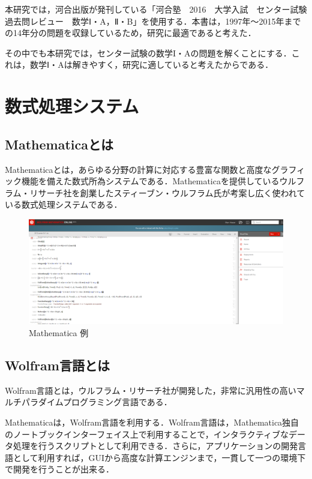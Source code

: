 本研究では，河合出版が発刊している「河合塾　2016　大学入試　センター試験過去問レビュー　数学Ⅰ・A，Ⅱ・B」を使用する．本書は，1997年～2015年までの14年分の問題を収録しているため，研究に最適であると考えた．

その中でも本研究では，センター試験の数学I・Aの問題を解くことにする．これは，数学Ⅰ・Aは解きやすく，研究に適していると考えたからである．




\chapter{数式処理システム}

\section{Mathematicaとは}

Mathematicaとは，あらゆる分野の計算に対応する豊富な関数と高度なグラフィック機能を備えた数式所為システムである．Mathematicaを提供しているウルフラム・リサーチ社を創業したスティーブン・ウルフラム氏が考案し広く使われている数式処理システムである．

\begin{figure}[h]
\centering
\includegraphics[width=15cm]{mathmatica.png}
\caption{Mathematica 例}\label{図}
\end{figure}

\clearpage

\section{Wolfram言語とは}

Wolfram言語とは，ウルフラム・リサーチ社が開発した，非常に汎用性の高いマルチパラダイムプログラミング言語である．

Mathematicaは，Wolfram言語を利用する．Wolfram言語は，Mathematica独自のノートブックインターフェイス上で利用することで，インタラクティブなデータ処理を行うスクリプトとして利用できる．さらに，アプリケーションの開発言語として利用すれば，GUIから高度な計算エンジンまで，一貫して一つの環境下で開発を行うことが出来る．

